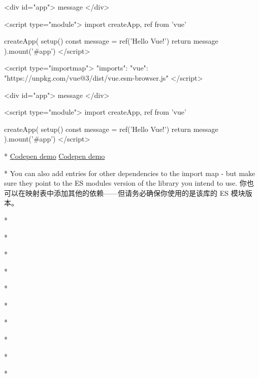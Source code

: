 \begin{paracol}{2}
\begin{codeHtml}
<div id="app">{{ message }}</div>

<script type="module">
import { createApp, ref } from 'vue'

createApp({
    setup() {
    const message = ref('Hello Vue!')
    return {
        message
    }
    }
}).mount('#app')
</script>
\end{codeHtml}  
\switchcolumn
\begin{codeHtml}
<script type="importmap">
{
    "imports": {
    "vue": "https://unpkg.com/vue@3/dist/vue.esm-browser.js"
    }
}
</script>

<div id="app">{{ message }}</div>

<script type="module">
import { createApp, ref } from 'vue'

createApp({
    setup() {
    const message = ref('Hello Vue!')
    return {
        message
    }
    }
}).mount('#app')
</script>
\end{codeHtml}  
\switchcolumn[0]*%
\href{https://codepen.io/vuejs-examples/pen/YzRyRYM}{Codepen demo}
\switchcolumn
\href{https://codepen.io/vuejs-examples/pen/YzRyRYM}{Codepen demo}

\switchcolumn[0]*%
You can also add entries for other dependencies to the import map - but
make sure they point to the ES modules version of the library you intend
to use.
\switchcolumn 
你也可以在映射表中添加其他的依赖------但请务必确保你使用的是该库的 ES
模块版本。

\switchcolumn[0]*%

\switchcolumn

\switchcolumn[0]*%

\switchcolumn


\switchcolumn[0]*%

\switchcolumn

\switchcolumn[0]*%

\switchcolumn


\switchcolumn[0]*%

\switchcolumn

\switchcolumn[0]*%

\switchcolumn


\switchcolumn[0]*%

\switchcolumn

\switchcolumn[0]*%

\switchcolumn


\switchcolumn[0]*%

\switchcolumn


\switchcolumn[0]*%


\end{paracol}
